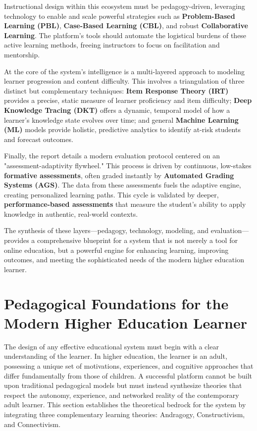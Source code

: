 \documentclass{article}
\begin{document}
Instructional design within this ecosystem must be pedagogy-driven, leveraging technology to enable and scale powerful strategies such as \textbf{Problem-Based Learning (PBL)}, \textbf{Case-Based Learning (CBL)}, and robust \textbf{Collaborative Learning}. The platform's tools should automate the logistical burdens of these active learning methods, freeing instructors to focus on facilitation and mentorship.

At the core of the system's intelligence is a multi-layered approach to modeling learner progression and content difficulty. This involves a triangulation of three distinct but complementary techniques: \textbf{Item Response Theory (IRT)} provides a precise, static measure of learner proficiency and item difficulty; \textbf{Deep Knowledge Tracing (DKT)} offers a dynamic, temporal model of how a learner's knowledge state evolves over time; and general \textbf{Machine Learning (ML)} models provide holistic, predictive analytics to identify at-risk students and forecast outcomes.

Finally, the report details a modern evaluation protocol centered on an "assessment-adaptivity flywheel." This process is driven by continuous, low-stakes \textbf{formative assessments}, often graded instantly by \textbf{Automated Grading Systems (AGS)}. The data from these assessments fuels the adaptive engine, creating personalized learning paths. This cycle is validated by deeper, \textbf{performance-based assessments} that measure the student's ability to apply knowledge in authentic, real-world contexts.

The synthesis of these layers—pedagogy, technology, modeling, and evaluation—provides a comprehensive blueprint for a system that is not merely a tool for online education, but a powerful engine for enhancing learning, improving outcomes, and meeting the sophisticated needs of the modern higher education learner.

\section{Pedagogical Foundations for the Modern Higher Education Learner}

The design of any effective educational system must begin with a clear understanding of the learner. In higher education, the learner is an adult, possessing a unique set of motivations, experiences, and cognitive approaches that differ fundamentally from those of children. A successful platform cannot be built upon traditional pedagogical models but must instead synthesize theories that respect the autonomy, experience, and networked reality of the contemporary adult learner. This section establishes the theoretical bedrock for the system by integrating three complementary learning theories: Andragogy, Constructivism, and Connectivism.
\end{document}
